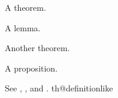 \begin{theorem}\flmLabels{\label{ref1}}
A theorem.
\end{theorem}

\begin{lemma}\flmLabels{\label{ref2}}\noproofref A lemma.
\end{lemma}

\begin{theorem}\flmLabels{\label{ref3}}
Another theorem.
\end{theorem}

\begin{proposition}\flmLabels{\label{ref4}}\noproofref A proposition.
\end{proposition}

See , ,  and .
\RequirePackage{amsthm}
\RequirePackage{zref-clever}
\ProvideDocumentCommand\noproofref{}{}
\ifcsname th@definitionlike\endcsname\else{}\fi
\ProvideDocumentCommand{}
%
